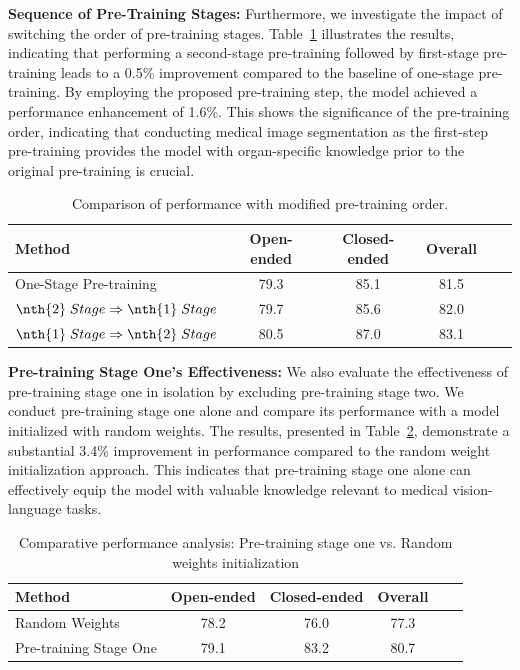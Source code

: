 {\bf Sequence of Pre-Training Stages:} Furthermore, we investigate the impact of switching the order of pre-training stages. Table~\ref{tab:compareOrder} illustrates the results, indicating that performing a second-stage pre-training followed by first-stage pre-training leads to a 0.5\% improvement compared to the baseline of one-stage pre-training. By employing the proposed pre-training step, the model achieved a performance enhancement of 1.6\%. This shows the significance of the pre-training order, indicating that conducting medical image segmentation as the first-step pre-training provides the model with organ-specific knowledge prior to the original pre-training is crucial.
\begin{table}[h]
    \centering
    \caption{Comparison of performance with modified pre-training order.}
    \setlength{\tabcolsep}{3.pt}
    \begin{tabular}{l c  c c c  c}
        \toprule
        Method &  Open-ended & Closed-ended & Overall  \\
        \midrule
         One-Stage Pre-training \cite{Dou_2022_CVPR}  & 79.3 & 85.1 & 81.5 \\
         $\nth{2} \; Stage \Rightarrow  \nth{1} \; Stage$  & 79.7 & 85.6 & 82.0 \\
        \rowcolor{LightCyan}
        $\nth{1} \; Stage \Rightarrow  \nth{2} \; Stage$ & 80.5 & 87.0 & 83.1 \\
        \bottomrule
    \end{tabular}
    \label{tab:compareOrder}
\end{table}


{\bf Pre-training Stage One's Effectiveness:} We also evaluate the effectiveness of pre-training stage one in isolation by excluding pre-training stage two. We conduct pre-training stage one alone and compare its performance with a model initialized with random weights. The results, presented in Table~\ref{tab:effectiveOfStageOne}, demonstrate a substantial 3.4\% improvement in performance compared to the random weight initialization approach. This indicates that pre-training stage one alone can effectively equip the model with valuable knowledge relevant to medical vision-language tasks.

\begin{table}[h]
    \centering
    \caption{Comparative performance analysis: Pre-training stage one vs. Random weights initialization}
    \setlength{\tabcolsep}{3.pt}
    \begin{tabular}{l c  c c c  c}
        \toprule
        Method &  Open-ended & Closed-ended & Overall  \\
        \midrule
        Random Weights & 78.2 & 76.0 & 77.3 \\
        \rowcolor{LightCyan}
        Pre-training Stage One & 79.1 & 83.2 & 80.7 \\
        \bottomrule
    \end{tabular}
    \label{tab:effectiveOfStageOne}
\end{table}

